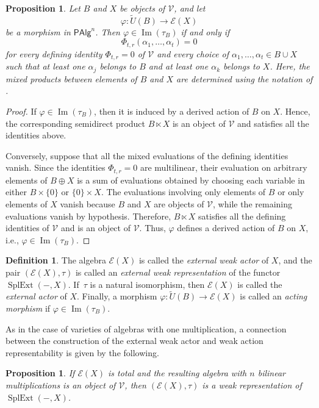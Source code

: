 \documentclass[reqno,a4paper]{amsart}
\theoremstyle{plain}
\newtheorem{proposition}[subsection]{Proposition}
\theoremstyle{definition}
\newtheorem{definition}[subsection]{Definition}
\theoremstyle{remark}
\numberwithin{equation}{section}
\newcommand{\E}{\mathcal{E}}
\newcommand{\V}{\mathcal{V}}
\DeclareMathOperator{\SplExt}{SplExt}
\DeclareMathOperator{\Imm}{Im}
\newcommand{\PAlg}{\ensuremath{\mathsf{PAlg}}}
\begin{document}
\begin{proposition}\label{ImageExternalRepresentationTwo}
Let $B$ and $X$ be objects of $\V$, and let
\[
\varphi\colon\widetilde U(B)\to\E(X)
\]
be a morphism in $\PAlg^n$. Then $\varphi \in \Imm(\tau_B)$ if and only if
\[
\Phi_{t,r}(\alpha_1,\ldots,\alpha_t)=0
\]
for every defining identity $\Phi_{t,r}=0$ of $\V$ and every choice of $\alpha_1,\ldots,\alpha_t\in B\cup X$ such that at least one $\alpha_j$ belongs to $B$ and at least one $\alpha_k$ belongs to $X$. Here, the mixed products between elements of $B$ and $X$ are determined using the notation of .
\end{proposition}

\begin{proof}
If $\varphi \in \Imm(\tau_B)$, then it is induced by a derived action of $B$ on $X$. Hence, the corresponding semidirect product $B\ltimes X$ is an object of $\V$ and satisfies all the identities above.

Conversely, suppose that all the mixed evaluations of the defining identities vanish. Since the identities $\Phi_{t,r}=0$ are multilinear, their evaluation on arbitrary elements of $B\oplus X$ is a sum of evaluations obtained by choosing each variable in either $B \times \{0\}$ or $\{0\} \times X$. The evaluations involving only elements of $B$ or only elements of $X$ vanish because $B$ and $X$ are objects of $\V$, while the remaining evaluations vanish by hypothesis. Therefore, $B\ltimes X$ satisfies all the defining identities of $\V$ and is an object of $\V$. Thus, $\varphi$ defines a derived action of $B$ on $X$, i.e., $\varphi \in \Imm(\tau_B)$.
\end{proof}

\begin{definition}
The algebra $\E(X)$ is called the \emph{external weak actor} of $X$, and the pair $(\E(X),\tau)$ is called an \emph{external weak representation} of the functor $\SplExt(-,X)$. If~$\tau$ is a natural isomorphism, then $\E(X)$ is called the \emph{external actor} of $X$. Finally, a morphism $\varphi\colon\widetilde U(B)\to\E(X)$ is called an \emph{acting morphism} if $\varphi\in\Imm(\tau_B)$.
\end{definition}

As in the case of varieties of algebras with one multiplication, a connection between the construction of the external weak actor and weak action representability is given by the following.

\begin{proposition}\label{ExternalActorTwoWRA}
If $\E(X)$ is total and the resulting algebra with $n$ bilinear multiplications is an object of $\V$, then $(\E(X),\tau)$ is a weak representation of $\SplExt(-,X)$.
\end{proposition}
\end{document}

